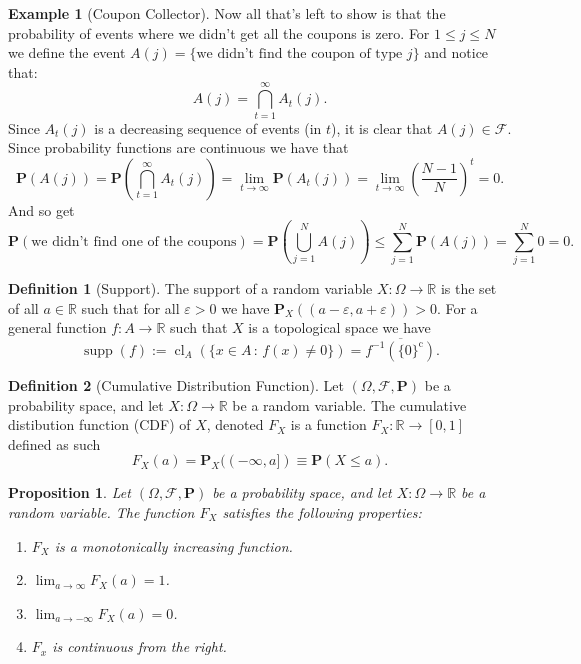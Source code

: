 \documentclass[11pt,a4paper]{article}
\theoremstyle{definition}
\newtheorem{definition}{Definition}[section]
\newtheorem{example}{Example}[section]
\theoremstyle{plain}
\newtheorem{proposition}[theorem]{Proposition}
\newcommand{\R}{\mathbb{R}}
\begin{document}
\begin{example}[Coupon Collector]
    Now all that's left to show is that the probability of events where we
    didn't get all the coupons is zero. For $1 \le j \le N$ we define the
    event $A(j) = \{\text{we didn't find the coupon of type $j$}\}$ and notice
    that:
    \[
      A(j) = \bigcap_{t=1}^{\infty} A_t(j).
    \]
    Since $A_t(j)$ is a decreasing sequence of events (in $t$), it is clear
    that $A(j) \in \mathcal F$. Since probability functions are continuous
    we have that
    \[
      \mathbf{P}(A(j)) =
      \mathbf{P}\left(\bigcap_{t=1}^{\infty}A_{t}(j)\right) =
      \lim_{t\to\infty}\mathbf{P}\left(A_{t}(j)\right) =
      \lim_{t\to\infty}\left({\frac{N-1}{N}}\right)^{t}=0.
    \]
    And so get
    \[
      \mathbf P(\text{we didn't find one of the coupons}) =
      \mathbf{P}\left(\bigcup_{j=1}^{N} A(j)\right) \leq
      \sum_{j=1}^{N} \mathbf{P}(A(j)) =
      \sum_{j=1}^{N} 0 =
      0.
    \]
  \end{example}
  \begin{definition}[Support]
    The support of a random variable $X \colon \Omega \to \R$ is the set of all $a \in \R$
    such that for all $\varepsilon > 0$ we have 
    $\mathbf P_X\left((a - \varepsilon, a + \varepsilon)\right) > 0$.
    For a general function $f \colon A \to \R$ such that $X$ is a topological
    space we have
    \[
      \operatorname {supp} (f) := 
      \operatorname {cl}_{A} 
      \left(\{x\in A\,:\,f(x)\neq 0\}\right) =
      {\overline {f^{-1}\left(\{0\}^{\mathrm {c} }\right)}}.
    \]
  \end{definition}
  \begin{definition}
  [Cumulative Distribution Function]
    Let $(\Omega, \mathcal F, \mathbf P)$ be a probability space,
    and let $X \colon \Omega \to \R$ be a random variable.
    The cumulative distibution function (CDF) of $X$, denoted $F_X$ is
    a function $F_X \colon \R \to [0,1]$ defined as such
    \[
      F_{X}(a) = \mathbf{P}_{X}((-\infty,a]) \equiv \mathbf{P}(X \leq a).
    \]
    \end{definition}
  \begin{proposition}
    Let $(\Omega, \mathcal F, \mathbf P)$ be a probability space,
    and let $X \colon \Omega \to \R$ be a random variable.
    The function $F_X$ satisfies the following properties:
    \begin{enumerate}
      \item $F_X$ is a monotonically increasing function.
      \item $\lim_{a \to \infty} F_X(a) = 1$.
      \item $\lim_{a \to -\infty} F_X(a) = 0$.
      \item $F_x$ is continuous from the right.
    \end{enumerate}
  \end{proposition}
\end{document}

